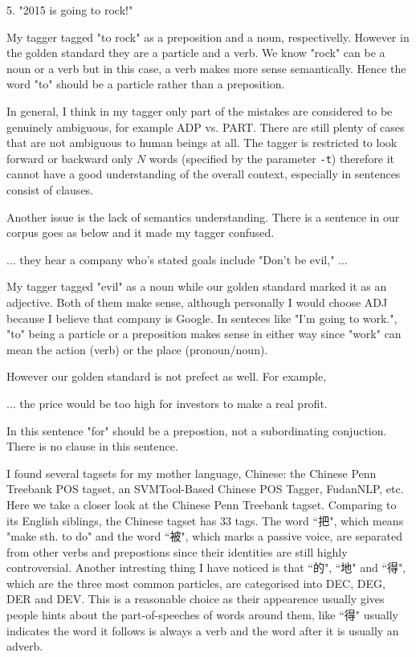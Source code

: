 \documentclass[11pt]{article} %
\begin{document}
\begin{displayquote}
  5. "2015 is going to rock!"
\end{displayquote}
My tagger tagged "to rock" as a preposition and a noun, respectivelly. However in the golden standard they are a particle and a verb. We know "rock" can be a noun or a verb but in this case, a verb makes more sense semantically. Hence the word "to" should be a particle rather than a preposition.

In general, I think in my tagger only part of the mistakes are considered to be genuinely ambiguous, for example ADP vs. PART. There are still plenty of cases that are not ambiguous to human beings at all. The tagger is restricted to look forward or backward only $N$ words (specified by the parameter \texttt{-t}) therefore it cannot have a good understanding of the overall context, especially in sentences consist of clauses.

Another issue is the lack of semantics understanding. There is a sentence in our corpus goes as below and it made my tagger confused.
\begin{displayquote}
  ... they hear a company who's stated goals include "Don't be evil," ...
\end{displayquote}
My tagger tagged "evil" as a noun while our golden standard marked it as an adjective. Both of them make sense, although personally I would choose ADJ because I believe that company is Google. In senteces like "I'm going to work.", "to" being a particle or a preposition makes sense in either way since "work" can mean the action (verb) or the place (pronoun/noun).

However our golden standard is not prefect as well. For example,
\begin{displayquote}
  ... the price would be too high for investors to make a real profit.
\end{displayquote}
In this sentence "for" should be a prepostion, not a subordinating conjuction. There is no clause in this sentence.

I found several tagsets for my mother language, Chinese: the Chinese Penn Treebank POS tagset\cite{xia2000part}, an SVMTool-Based Chinese POS Tagger\cite{王丽杰2009基于}, FudanNLP\cite{qiu2013fudannlp}, etc. Here we take a closer look at the Chinese Penn Treebank tagset. Comparing to its English siblings, the Chinese tagset has 33 tags. The word ``把", which means "make sth. to do" and the word ``被", which marks a passive voice, are separated from other verbs and prepostions since their identities are still highly controversial. Another intresting thing I have noticed is that ``的", ``地" and ``得", which are the three most common particles, are categorised into DEC, DEG, DER and DEV. This is a reasonable choice as their appearence usually gives people hints about the part-of-speeches of words around them, like ``得" usually indicates the word it follows is always a verb and the word after it is usually an adverb.
\end{document}
